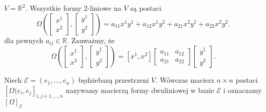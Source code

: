 \documentclass[../main.tex]{subfiles}
\begin{document}
    \begin{przyklad}
        $V = \mathbb{R}^2$. Wszystkie formy 2-liniowe na $V$ są postaci \[
            \Omega\left (\begin{bmatrix} x^1\\x^2 \end{bmatrix}, \begin{bmatrix} y^1\\y^2 \end{bmatrix} \right ) = a_{11}x^1y^1 + a_{12}x^1y^2 + a_{21}x^2y^1 + a_{22}x^2y^2
        .\] dla pewnych $a_{ij}\in\mathbb{R}$. Zauważmy, że
        \[
            \Omega \left( \begin{bmatrix} x^1\\x^2 \end{bmatrix} ,\begin{bmatrix} y^1\\y^2 \end{bmatrix}  \right) = \left[ x^1,x^2 \right] \begin{bmatrix} a_{11}&a_{12}\\ a_{21}&a_{22} \end{bmatrix} \begin{bmatrix} y^1\\y^2 \end{bmatrix}
        .\]
    \end{przyklad}
    \begin{definicja}
        Niech $\mathcal{E}=\left( e_1,\ldots,e_n \right) $ będziebazą przestrzeni $V$. Wówczas macierz $n\times n$ postaci $\left[ \Omega (e_{i},e_{j} \right]_{i,j\in 1,\ldots,n}$ nazywamy macierzą formy dwuliniowej w bazie $\mathcal{E}$ i oznaczamy $\left[ \Omega \right]_\mathcal{E}$
    \end{definicja}
\end{document}

